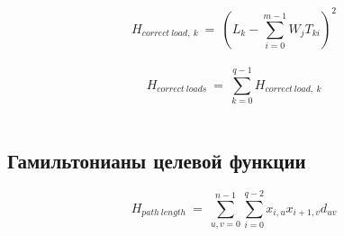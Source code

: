\documentclass{article}
\begin{document}
\[H_{correct \ load, \ k} \ =\ (L_{k} - \sum_{i=0}^{m-1} W_{j} T_{ki})^2 \]\\
\[H_{correct \ loads} \ =\ \sum_{k=0}^{q-1}H_{correct \ load, \ k}\]\\


\subsection{Гамильтонианы целевой функции}
\[H_{path \ length} \ =\ \sum_{u, v = 0}^{n-1} \sum_{i=0}^{q-2}x_{i,u}x_{i+1, v} d_{uv}\]\\
\end{document}

